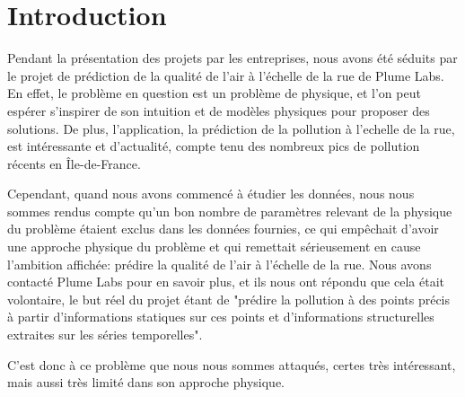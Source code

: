 \section*{Introduction}

Pendant la présentation des projets par les entreprises, nous avons été séduits par le projet de prédiction de la qualité de l'air à l'échelle de la rue de Plume Labs.
En effet, le problème en question est un problème de physique, et l'on peut espérer s'inspirer de son intuition et de modèles physiques pour proposer des solutions.
De plus, l'application, la prédiction de la pollution à l'echelle de la rue, est intéressante et d'actualité, compte tenu des nombreux pics de pollution récents en Île-de-France.

Cependant, quand nous avons commencé à étudier les données, nous nous sommes rendus compte qu'un bon nombre de paramètres relevant de la physique du problème étaient exclus dans les données fournies, ce qui empêchait d'avoir une approche physique du problème et qui remettait sérieusement en cause l'ambition affichée: prédire la qualité de l'air à l'échelle de la rue.
Nous avons contacté Plume Labs pour en savoir plus, et ils nous ont répondu que cela était volontaire, le but réel du projet étant de "prédire la pollution à des points précis à partir d'informations statiques sur ces points et d'informations structurelles extraites sur les séries temporelles".

C'est donc à ce problème que nous nous sommes attaqués, certes très intéressant, mais aussi très limité dans son approche physique.

